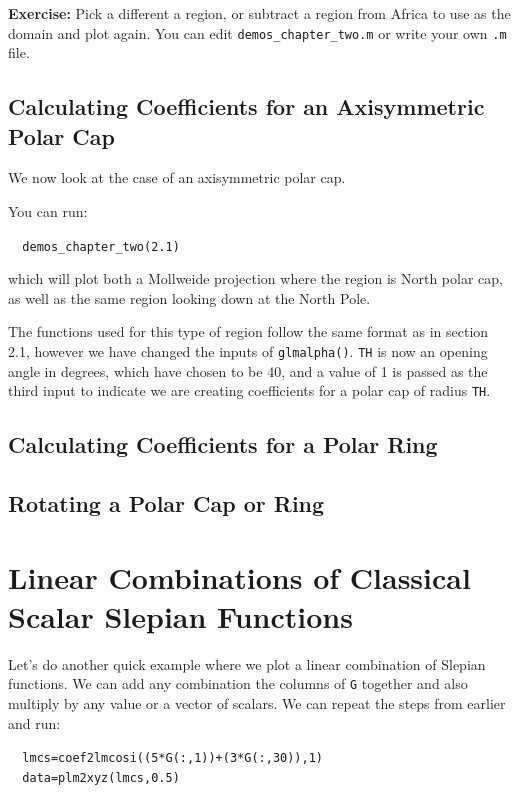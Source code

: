\documentclass[11pt]{article}
\begin{document}
\textbf{Exercise:} Pick a different a region, or subtract a region from Africa to use as the domain and plot again. You can edit \verb|demos_chapter_two.m| or write your own \verb|.m| file.  

\subsection{Calculating Coefficients for an Axisymmetric Polar Cap}

We now look at the case of an axisymmetric polar cap.

You can run:

\verb|	demos_chapter_two(2.1)|

which will plot both a Mollweide projection where the region is North polar cap, as well as the same region looking down at the North Pole.

The functions used for this type of region follow the same format as in section 2.1, however we have changed the inputs of \verb|glmalpha()|. \verb|TH| is now an opening angle in degrees, which have chosen to be 40, and a value of 1 is passed as the third input to indicate we are creating coefficients for a polar cap of radius \verb|TH|.

\subsection{Calculating Coefficients for a Polar Ring}

\subsection{Rotating a Polar Cap or Ring}

\section{Linear Combinations of Classical Scalar Slepian Functions}

Let's do another quick example where we plot a linear combination of Slepian functions. We can add any combination the columns of \verb+G+ together and also multiply by any value or a vector of scalars. We can repeat the steps from earlier and run:

\verb|	lmcs=coef2lmcosi((5*G(:,1))+(3*G(:,30)),1)| \\
\verb|	data=plm2xyz(lmcs,0.5)|\\
\end{document}
